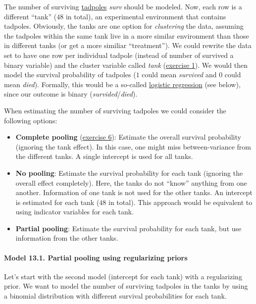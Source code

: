 \documentclass[
]{article}
\providecommand{\tightlist}{%
  \setlength{\itemsep}{0pt}\setlength{\parskip}{0pt}}
\begin{document}
The number of surviving
\href{https://en.wikipedia.org/wiki/Tadpole}{tadpoles} \emph{surv}
should be modeled. Now, each row is a different ``tank'' (\(48\) in
total), an experimental environment that contains tadpoles. Obviously,
the tanks are one option for \emph{clustering} the data, assuming the
tadpoles within the same tank live in a more similar environment than
those in different tanks (or get a more similiar ``treatment''). We
could rewrite the data set to have one row per individual tadpole
(instead of number of survived a binary variable) and the cluster
variable called \emph{tank} (\hyperref[exercise1_LMM]{exercise 1}). We
would then model the survival probability of tadpoles (\(1\) could mean
\emph{survived} and \(0\) could mean \emph{died}). Formally, this would
be a so-called
\href{https://en.wikipedia.org/wiki/Logistic_regression}{logistic
regression} (see below), since our outcome is binary
(\emph{survided}/\emph{died}).

When estimating the number of surviving tadpoles we could consider the
following options:

\begin{itemize}
\tightlist
\item
  \textbf{Complete pooling} (\hyperref[exercise6_LMM]{exercise 6}):
  Estimate the overall survival probability (ignoring the tank effect).
  In this case, one might miss between-variance from the different
  tanks. A single intercept is used for all tanks.
\item
  \textbf{No pooling}: Estimate the survival probability for each tank
  (ignoring the overall effect completely). Here, the tanks do not
  ``know'' anything from one another. Information of one tank is not
  used for the other tanks. An intercept is estimated for each tank
  (\(48\) in total). This approach would be equivalent to using
  indicator variables for each tank.
\item
  \textbf{Partial pooling}: Estimate the survival probability for each
  tank, but use information from the other tanks.
\end{itemize}

\paragraph{Model 13.1. Partial pooling using regularizing
priors}\label{model13_1}

Let's start with the second model (intercept for each tank) with a
regularizing prior. We want to model the number of surviving tadpoles in
the tanks by using a binomial distribution with different survival
probabilities for each tank.
\end{document}
